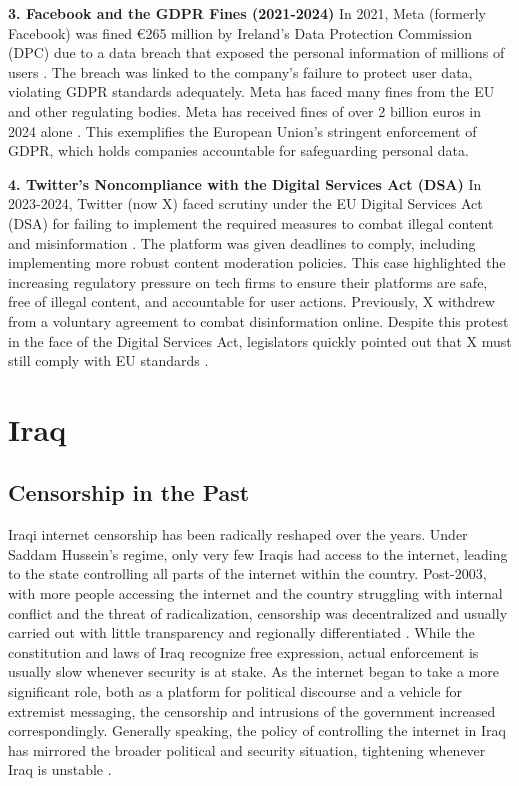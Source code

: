 \textbf{3. Facebook and the GDPR Fines (2021-2024)}
In 2021, Meta (formerly Facebook) was fined €265 million by Ireland's Data Protection Commission (DPC) due to a data breach that exposed the personal information of millions of users \cite{facebook2023}. The breach was linked to the company's failure to protect user data, violating GDPR standards adequately. Meta has faced many fines from the EU and other regulating bodies. Meta has received fines of over 2 billion euros in 2024 alone \cite{FBFines}. This exemplifies the European Union's stringent enforcement of GDPR, which holds companies accountable for safeguarding personal data. 

\textbf{4. Twitter's Noncompliance with the Digital Services Act (DSA)}
In 2023-2024, Twitter (now X) faced scrutiny under the EU Digital Services Act (DSA) for failing to implement the required measures to combat illegal content and misinformation \cite{twitter2023}. The platform was given deadlines to comply, including implementing more robust content moderation policies. This case highlighted the increasing regulatory pressure on tech firms to ensure their platforms are safe, free of illegal content, and accountable for user actions. Previously, X withdrew from a voluntary agreement to combat disinformation online. Despite this protest in the face of the Digital Services Act, legislators quickly pointed out that X must still comply with EU standards \cite{bhr2023}.

\section{Iraq}
\label{sec:Iraq-Censorship}

\subsection{Censorship in the Past}

Iraqi internet censorship has been radically reshaped over the years. Under Saddam Hussein's regime, only very few Iraqis had access to the internet, leading to the state controlling all parts of the internet within the country. Post-2003, with more people accessing the internet and the country struggling with internal conflict and the threat of radicalization, censorship was decentralized and usually carried out with little transparency and regionally differentiated \cite{USDoSHumanRights2012}. While the constitution and laws of Iraq recognize free expression, actual enforcement is usually slow whenever security is at stake. As the internet began to take a more significant role, both as a platform for political discourse and a vehicle for extremist messaging, the censorship and intrusions of the government increased correspondingly. Generally speaking, the policy of controlling the internet in Iraq has mirrored the broader political and security situation, tightening whenever Iraq is unstable \cite{freedomhouseIraqFreedom}.

